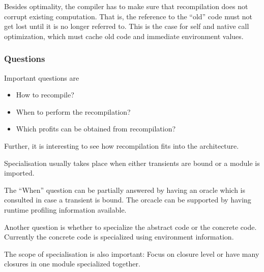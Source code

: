 Besides optimality, the compiler has to make sure that recompilation
does not corrupt existing computation. That is, the reference to the
``old'' code must not get lost until it is no longer referred to.
This is the case for self and native call optimization, which
must cache old code and immediate environment values.
\subsubsection{Questions}
Important questions are
\begin{itemize}
\item How to recompile?
\item When to perform the recompilation?
\item Which profits can be obtained from recompilation?
\end{itemize}
Further, it is interesting to see how recompilation fits into the architecture.

Specialisation usually takes place when either transients are bound or
a module is imported.

The ``When'' question can be partially answered by having an oracle
which is consulted in case a transient is bound.
The orcacle can be supported by having runtime profiling information
available. 

Another question is whether to specialize the abstract code or the concrete
code. Currently the concrete code is specialized using environment information.

The scope of specialisation is also important: Focus on closure level or
have many closures in one module specialized together.